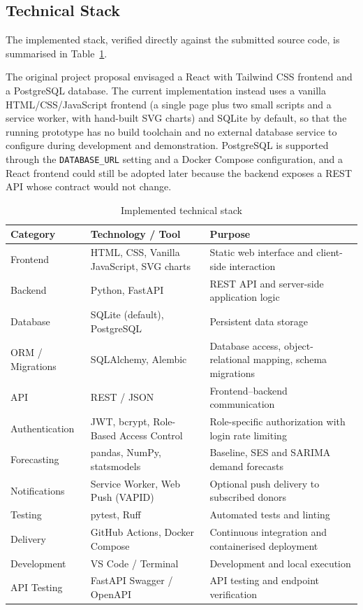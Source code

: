 \documentclass[12pt,a4paper,twoside]{report}
\begin{document}
\subsection{Technical Stack}
The implemented stack, verified directly against the submitted source code, is summarised in Table~\ref{tab:stack}.

The original project proposal envisaged a React with Tailwind CSS frontend and a PostgreSQL database. The current implementation instead uses a vanilla HTML/CSS/JavaScript frontend (a single page plus two small scripts and a service worker, with hand-built SVG charts) and SQLite by default, so that the running prototype has no build toolchain and no external database service to configure during development and demonstration. PostgreSQL is supported through the \texttt{DATABASE\_URL} setting and a Docker Compose configuration, and a React frontend could still be adopted later because the backend exposes a REST API whose contract would not change.

\begin{table}[H]\centering
\begin{tabular}{@{}>{\raggedright}p{}>{\raggedright}p{}>{\raggedright\arraybackslash}p{}@{}}
\toprule
\textbf{Category} & \textbf{Technology / Tool} & \textbf{Purpose}\\\midrule
Frontend & HTML, CSS, Vanilla JavaScript, SVG charts & Static web interface and client-side interaction\\
Backend & Python, FastAPI & REST API and server-side application logic\\
Database & SQLite (default), PostgreSQL & Persistent data storage\\
ORM / Migrations & SQLAlchemy, Alembic & Database access, object-relational mapping, schema migrations\\
API & REST / JSON & Frontend--backend communication\\
Authentication & JWT, bcrypt, Role-Based Access Control & Role-specific authorization with login rate limiting\\
Forecasting & pandas, NumPy, statsmodels & Baseline, SES and SARIMA demand forecasts\\
Notifications & Service Worker, Web Push (VAPID) & Optional push delivery to subscribed donors\\
Testing & pytest, Ruff & Automated tests and linting\\
Delivery & GitHub Actions, Docker Compose & Continuous integration and containerised deployment\\
Development & VS Code / Terminal & Development and local execution\\
API Testing & FastAPI Swagger / OpenAPI & API testing and endpoint verification\\
\bottomrule
\end{tabular}
\caption{Implemented technical stack}\label{tab:stack}
\end{table}
\end{document}
